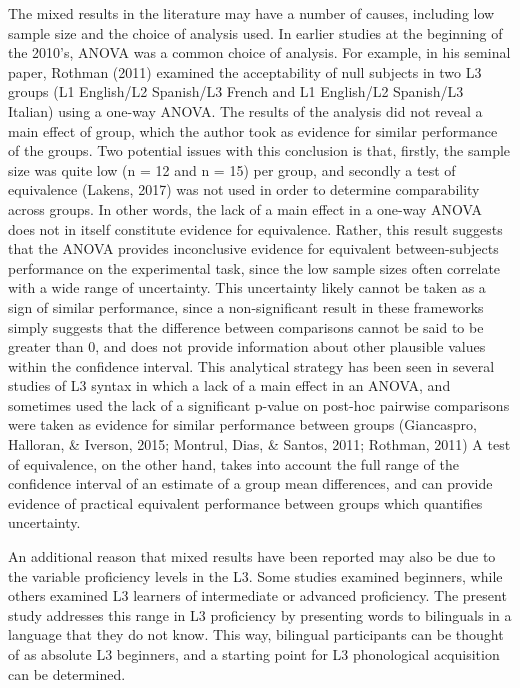 \documentclass[
  english,
  man]{apa6}
\begin{document}
The mixed results in the literature may have a number of causes, including low sample size and the choice of analysis used.
In earlier studies at the beginning of the 2010's, ANOVA was a common choice of analysis.
For example, in his seminal paper, Rothman (2011) examined the acceptability of null subjects in two L3 groups (L1 English/L2 Spanish/L3 French and L1 English/L2 Spanish/L3 Italian) using a one-way ANOVA.
The results of the analysis did not reveal a main effect of group, which the author took as evidence for similar performance of the groups.
Two potential issues with this conclusion is that, firstly, the sample size was quite low (n = 12 and n = 15) per group, and secondly a test of equivalence (Lakens, 2017) was not used in order to determine comparability across groups.
In other words, the lack of a main effect in a one-way ANOVA does not in itself constitute evidence for equivalence.
Rather, this result suggests that the ANOVA provides inconclusive evidence for equivalent between-subjects performance on the experimental task, since the low sample sizes often correlate with a wide range of uncertainty.
This uncertainty likely cannot be taken as a sign of similar performance, since a non-significant result in these frameworks simply suggests that the difference between comparisons cannot be said to be greater than 0, and does not provide information about other plausible values within the confidence interval.
This analytical strategy has been seen in several studies of L3 syntax in which a lack of a main effect in an ANOVA, and sometimes used the lack of a significant p-value on post-hoc pairwise comparisons were taken as evidence for similar performance between groups (Giancaspro, Halloran, \& Iverson, 2015; Montrul, Dias, \& Santos, 2011; Rothman, 2011)
A test of equivalence, on the other hand, takes into account the full range of the confidence interval of an estimate of a group mean differences, and can provide evidence of practical equivalent performance between groups which quantifies uncertainty.

An additional reason that mixed results have been reported may also be due to the variable proficiency levels in the L3.
Some studies examined beginners, while others examined L3 learners of intermediate or advanced proficiency.
The present study addresses this range in L3 proficiency by presenting words to bilinguals in a language that they do not know.
This way, bilingual participants can be thought of as absolute L3 beginners, and a starting point for L3 phonological acquisition can be determined.
\end{document}

